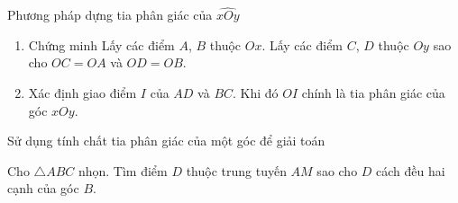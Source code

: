 \begin{note}
	Phương pháp dựng tia phân giác của $\widehat{xOy}$
	\begin{enumerate}[Bước 1.]
		\item Chứng minh Lấy các điểm $A$, $B$ thuộc $Ox$. Lấy các điểm $C$, $D$ thuộc $Oy$ sao cho $OC=OA$ và $OD=OB$.
		\item Xác định giao điểm $I$ của $AD$ và $BC$. Khi đó $OI$ chính là tia phân giác của góc $xOy$.
	\end{enumerate}
\end{note}

\begin{dang}{Sử dụng tính chất tia phân giác của một góc để giải toán}
\end{dang}
\begin{vd}%
	Cho $\triangle ABC$ nhọn. Tìm điểm $D$ thuộc trung tuyến $AM$ sao cho $D$ cách đều hai cạnh của góc $B$.
\end{vd}
